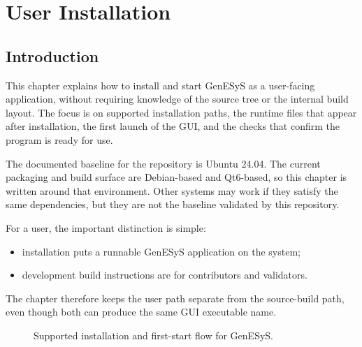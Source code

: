 \chapter{User Installation}
\label{chap:user-installation}

\section{Introduction}
\label{sec:user-installation-introduction}

This chapter explains how to install and start GenESyS as a user-facing
application, without requiring knowledge of the source tree or the internal
build layout. The focus is on supported installation paths, the runtime files
that appear after installation, the first launch of the GUI, and the checks
that confirm the program is ready for use.

The documented baseline for the repository is Ubuntu 24.04. The current
packaging and build surface are Debian-based and Qt6-based, so this chapter is
written around that environment. Other systems may work if they satisfy the
same dependencies, but they are not the baseline validated by this repository.

For a user, the important distinction is simple:
\begin{itemize}
\item installation puts a runnable GenESyS application on the system;
\item development build instructions are for contributors and validators.
\end{itemize}

The chapter therefore keeps the user path separate from the source-build path,
even though both can produce the same GUI executable name.

\begin{figure}[htbp]
    \centering



    \caption{Supported installation and first-start flow for GenESyS.}
    \label{fig:user-installation-flow}
\end{figure}

